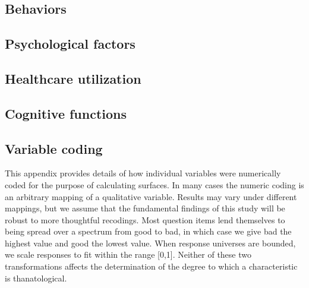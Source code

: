 \documentclass{article}
\begin{document}
\subsection{Behaviors}

\FloatBarrier

\pagebreak
\subsection{Psychological factors}

\FloatBarrier

\subsection{Healthcare utilization}

\FloatBarrier

\pagebreak
\subsection{Cognitive functions}


\FloatBarrier

   
  
\pagebreak

\begin{appendices}
\section{Variable coding}
This appendix provides details of how individual variables were numerically
coded for the purpose of calculating surfaces. In many cases the numeric coding
is an arbitrary mapping of a qualitative variable. Results may vary under
different mappings, but we assume that the fundamental findings of this study
will be robust to more thoughtful recodings. Most question items lend themselves
to being spread over a spectrum from good to bad, in which case we give bad the
highest value and good the lowest value. When response universes are bounded, we
scale responses to fit within the range [0,1]. Neither of these
two transformations affects the determination of the degree to which a
characteristic is thanatological.
\end{appendices}




  
\end{document}
